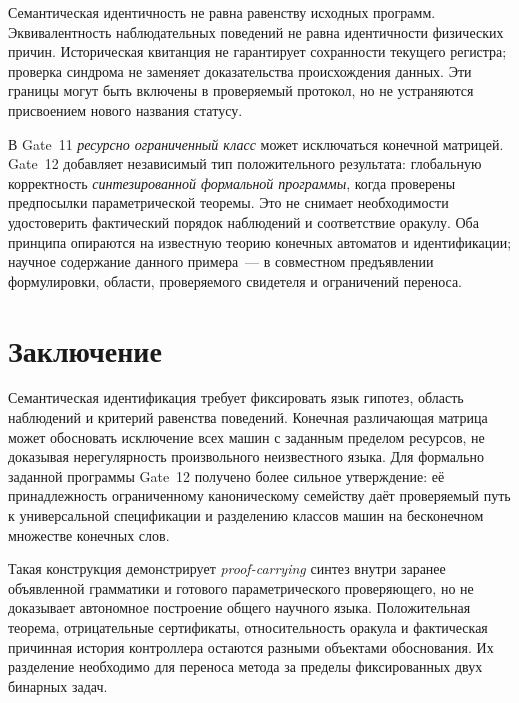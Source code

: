 \documentclass[11pt,a4paper]{article}
\begin{document}
Семантическая идентичность не равна равенству исходных программ. Эквивалентность наблюдательных поведений не равна идентичности физических причин. Историческая квитанция не гарантирует сохранности текущего регистра; проверка синдрома не заменяет доказательства происхождения данных. Эти границы могут быть включены в проверяемый протокол, но не устраняются присвоением нового названия статусу.

В Gate~11 \emph{ресурсно ограниченный класс} может исключаться конечной матрицей. Gate~12 добавляет независимый тип положительного результата: глобальную корректность \emph{синтезированной формальной программы}, когда проверены предпосылки параметрической теоремы. Это не снимает необходимости удостоверить фактический порядок наблюдений и соответствие оракулу. Оба принципа опираются на известную теорию конечных автоматов и идентификации; научное содержание данного примера~--- в совместном предъявлении формулировки, области, проверяемого свидетеля и ограничений переноса.

\section{Заключение}

Семантическая идентификация требует фиксировать язык гипотез, область наблюдений и критерий равенства поведений. Конечная различающая матрица может обосновать исключение всех машин с заданным пределом ресурсов, не доказывая нерегулярность произвольного неизвестного языка. Для формально заданной программы Gate~12 получено более сильное утверждение: её принадлежность ограниченному каноническому семейству даёт проверяемый путь к универсальной спецификации и разделению классов машин на бесконечном множестве конечных слов.

Такая конструкция демонстрирует \emph{proof-carrying} синтез внутри заранее объявленной грамматики и готового параметрического проверяющего, но не доказывает автономное построение общего научного языка. Положительная теорема, отрицательные сертификаты, относительность оракула и фактическая причинная история контроллера остаются разными объектами обоснования. Их разделение необходимо для переноса метода за пределы фиксированных двух бинарных задач.
\end{document}
